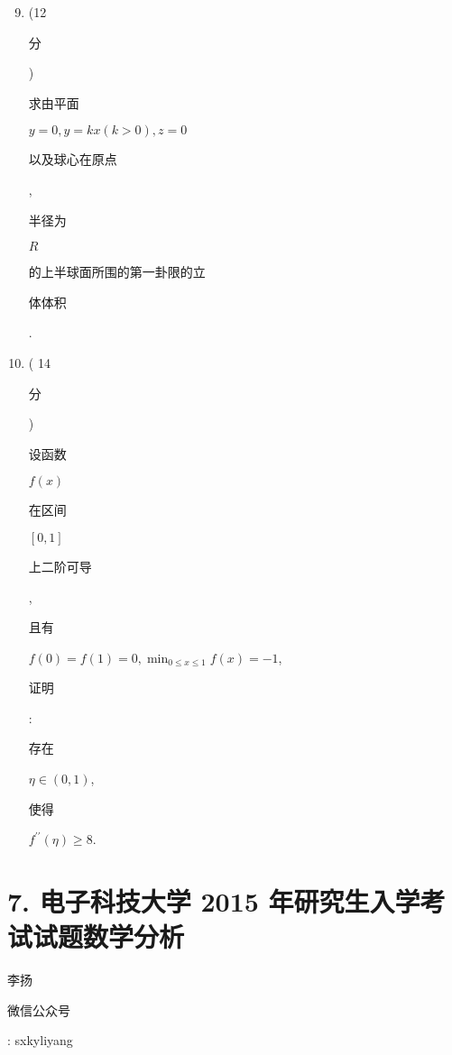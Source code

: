 \documentclass[10pt]{article}
\begin{document}
\begin{enumerate}
  \setcounter{enumi}{8}
  \item (12 \begin{CJK}{UTF8}{mj}分\end{CJK}) \begin{CJK}{UTF8}{mj}求由平面\end{CJK} $y=0, y=k x(k>0), z=0$ \begin{CJK}{UTF8}{mj}以及球心在原点\end{CJK}, \begin{CJK}{UTF8}{mj}半径为\end{CJK} $R$ \begin{CJK}{UTF8}{mj}的上半球面所围的第一卦限的立\end{CJK} \begin{CJK}{UTF8}{mj}体体积\end{CJK}.

  \item ( 14 \begin{CJK}{UTF8}{mj}分\end{CJK}) \begin{CJK}{UTF8}{mj}设函数\end{CJK} $f(x)$ \begin{CJK}{UTF8}{mj}在区间\end{CJK} $[0,1]$ \begin{CJK}{UTF8}{mj}上二阶可导\end{CJK}, \begin{CJK}{UTF8}{mj}且有\end{CJK} $f(0)=f(1)=0, \min _{0 \leqslant x \leqslant 1} f(x)=-1$, \begin{CJK}{UTF8}{mj}证明\end{CJK}: \begin{CJK}{UTF8}{mj}存在\end{CJK} $\eta \in(0,1)$, \begin{CJK}{UTF8}{mj}使得\end{CJK} $f^{\prime \prime}(\eta) \geqslant 8$.

\end{enumerate}
\section{7. 电子科技大学 2015 年研究生入学考试试题数学分析}
\begin{CJK}{UTF8}{mj}李扬\end{CJK}

\begin{CJK}{UTF8}{mj}微信公众号\end{CJK}: sxkyliyang
\end{document}
